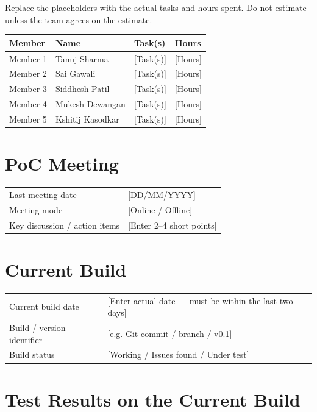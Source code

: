 \documentclass[11pt]{article}
\newcommand{\bracket}[1]{\textcolor{gray!70!black}{[#1]}}
\begin{document}
Replace the placeholders with the actual tasks and hours spent. Do not estimate unless the team agrees on the estimate.

\begin{tabularx}{\textwidth}{@{} l l Y l @{}}
  \toprule
  \textbf{Member} & \textbf{Name} & \textbf{Task(s)} & \textbf{Hours} \\
  \midrule
  Member 1 & Tanuj Sharma & \bracket{Task(s)} & \bracket{Hours} \\
  Member 2 & Sai Gawali & \bracket{Task(s)} & \bracket{Hours} \\
  Member 3 & Siddhesh Patil & \bracket{Task(s)} & \bracket{Hours} \\
  Member 4 & Mukesh Dewangan & \bracket{Task(s)} & \bracket{Hours} \\
  Member 5 & Kshitij Kasodkar & \bracket{Task(s)} & \bracket{Hours} \\
  \bottomrule
\end{tabularx}

\section{PoC Meeting}

\begin{tabularx}{\textwidth}{@{} l Y @{}}
  \toprule
  Last meeting date & \bracket{DD/MM/YYYY} \\
  Meeting mode & \bracket{Online / Offline} \\
  Key discussion / action items & \bracket{Enter 2--4 short points} \\
  \bottomrule
\end{tabularx}

\section{Current Build}

\begin{tabularx}{\textwidth}{@{} l Y @{}}
  \toprule
  Current build date & \bracket{Enter actual date --- must be within the last two days} \\
  Build / version identifier & \bracket{e.g. Git commit / branch / v0.1} \\
  Build status & \bracket{Working / Issues found / Under test} \\
  \bottomrule
\end{tabularx}

\section{Test Results on the Current Build}
\end{document}
